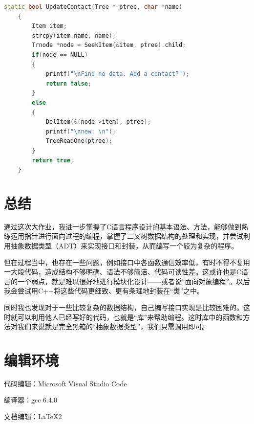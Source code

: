 \documentclass[12pt, a4paper, oneside]{ctexart}
\begin{document}
\begin{framed}
\begin{lstlisting}[language=C++]
    static bool UpdateContact(Tree * ptree, char *name)
    {   
        Item item;
        strcpy(item.name, name);
        Trnode *node = SeekItem(&item, ptree).child;
        if(node == NULL)
        {
            printf("\nFind no data. Add a contact?");
            return false;
        }
        else
        {
            DelItem(&(node->item), ptree);
            printf("\nnew: \n");
            TreeReadOne(ptree);
        }
        return true;
    }
\end{lstlisting}
\end{framed}

\section{总结}
通过这次大作业，我进一步掌握了C语言程序设计的基本语法、方法，能够做到熟练运用指针进行面向过程的编程，掌握了二叉树数据结构的处理和实现，并尝试利用抽象数据类型（ADT）来实现接口和封装，从而编写一个较为复杂的程序。

但在过程当中，也存在一些问题，例如接口中各函数通信效率低，有时不得不复用一大段代码，造成结构不够明确、语法不够简洁、代码可读性差。这或许也是C语言的一个弱点，就是难以很好地进行模块化设计——或者说“面向对象编程”。以后我会尝试用C++将这些代码更细致、更有条理地封装在“类”之中。

同时我也发现对于一些比较复杂的数据结构，自己编写接口实现是比较困难的。这时就可以利用他人已经写好的代码，也就是“库”来帮助编程。这时库中的函数和方法对我们来说就是完全黑箱的“抽象数据类型”，我们只需调用即可。

\section*{编辑环境}
    代码编辑：Microsoft Visual Studio Code

    编译器：gcc 6.4.0 
    
    文档编辑：\LaTeX 2
\end{document}
